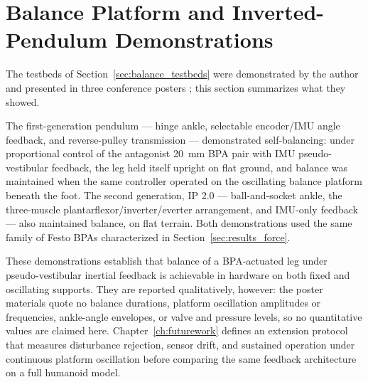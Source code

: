 \section{Balance Platform and Inverted-Pendulum Demonstrations}\label{sec:results_balance}

The testbeds of Section~\ref{sec:balance_testbeds} were demonstrated by the author and presented in three conference posters \citep{bolen_balance_2024, bolen_selfbalancing_2024, bolen_selfbalancing_srs_2024}; this section summarizes what they showed.

The first-generation pendulum --- hinge ankle, selectable encoder/IMU angle feedback, and reverse-pulley transmission --- demonstrated self-balancing: under proportional control of the antagonist \qty{20}{\mm} BPA pair with IMU pseudo-vestibular feedback, the leg held itself upright on flat ground, and balance was maintained when the same controller operated on the oscillating balance platform beneath the foot. The second generation, IP 2.0 --- ball-and-socket ankle, the three-muscle plantarflexor/inverter/everter arrangement, and IMU-only feedback --- also maintained balance, on flat terrain. Both demonstrations used the same family of Festo BPAs characterized in Section~\ref{sec:results_force}.

These demonstrations establish that balance of a BPA-actuated leg under pseudo-vestibular inertial feedback is achievable in hardware on both fixed and oscillating supports. They are reported qualitatively, however: the poster materials quote no balance durations, platform oscillation amplitudes or frequencies, ankle-angle envelopes, or valve and pressure levels, so no quantitative values are claimed here. Chapter~\ref{ch:futurework} defines an extension protocol that measures disturbance rejection, sensor drift, and sustained operation under continuous platform oscillation before comparing the same feedback architecture on a full humanoid model.

